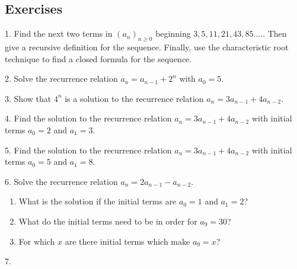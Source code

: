 \documentclass[12pt,]{book}
\theoremstyle{plain}
\theoremstyle{definition}
\theoremstyle{definition}
\theoremstyle{definition}
\numberwithin{equation}{chapter}
\begin{document}
\subsection*{Exercises}\label{exercises-sec-recurrence}
\begin{exerciselist}
\item[1.]\hypertarget{exercise-33}{}\hypertarget{p-338}{}%
Find the next two terms in \((a_n)_{n\ge 0}\) beginning \(3, 5, 11, 21, 43, 85\ldots.\). Then give a recursive definition for the sequence. Finally, use the characteristic root technique to find a closed formula for the sequence.%
\par\smallskip
\item[2.]\hypertarget{exercise-34}{}\hypertarget{p-340}{}%
Solve the recurrence relation \(a_n = a_{n-1} + 2^n\) with \(a_0 = 5\).%
\par\smallskip
\item[3.]\hypertarget{exercise-35}{}\hypertarget{p-342}{}%
Show that \(4^n\) is a solution to the recurrence relation \(a_n = 3a_{n-1} + 4a_{n-2}\).%
\par\smallskip
\item[4.]\hypertarget{exercise-36}{}\hypertarget{p-344}{}%
Find the solution to the recurrence relation \(a_n = 3a_{n-1} + 4a_{n-2}\) with initial terms \(a_0 = 2\) and \(a_1 = 3\).%
\par\smallskip
\item[5.]\hypertarget{exercise-37}{}\hypertarget{p-346}{}%
Find the solution to the recurrence relation \(a_n = 3a_{n-1} + 4a_{n-2}\) with initial terms \(a_0 = 5\) and \(a_1 = 8\).%
\par\smallskip
\item[6.]\hypertarget{exercise-38}{}\hypertarget{p-347}{}%
Solve the recurrence relation \(a_n = 2a_{n-1} - a_{n-2}\).%
\leavevmode%
\begin{enumerate}[label=(\alph*)]
\item\hypertarget{li-180}{}\hypertarget{p-348}{}%
What is the solution if the initial terms are \(a_0 = 1\) and \(a_1 = 2\)?%
\item\hypertarget{li-181}{}\hypertarget{p-349}{}%
What do the initial terms need to be in order for \(a_9 = 30\)?%
\item\hypertarget{li-182}{}\hypertarget{p-350}{}%
For which \(x\) are there initial terms which make \(a_9 = x\)?%
\end{enumerate}
\par\smallskip
\item[7.]\hypertarget{exercise-39}{}\hypertarget{p-351}{}%

\end{exerciselist}
\end{document}
